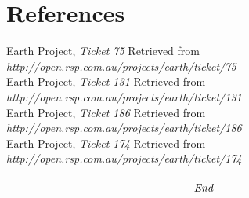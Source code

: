 \documentclass[10pt,a4,oneside]{article}
\begin{document}
\newpage

\section{References}

Earth Project, \textit{Ticket 75} Retrieved from \emph{http://open.rsp.com.au/projects/earth/ticket/75} \\
\newline
Earth Project, \textit{Ticket 131} Retrieved from \emph{http://open.rsp.com.au/projects/earth/ticket/131} \\
\newline
Earth Project, \textit{Ticket 186} Retrieved from \emph{http://open.rsp.com.au/projects/earth/ticket/186} \\
\newline
Earth Project, \textit{Ticket 174} Retrieved from \emph{http://open.rsp.com.au/projects/earth/ticket/174} \\

\paragraph{}

\[\emph{End}\]
\end{document}
